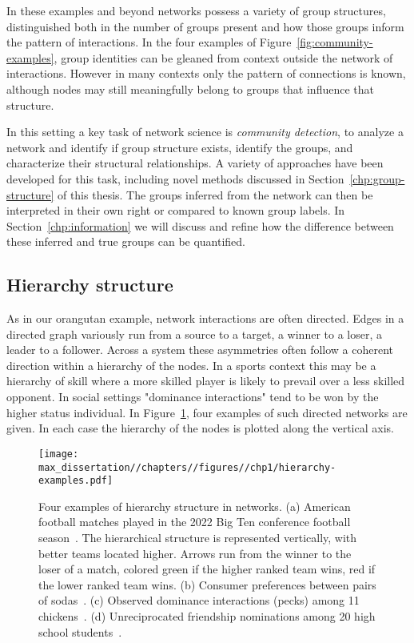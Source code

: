 In these examples and beyond networks possess a variety of group structures, distinguished both in the number of groups present and how those groups inform the pattern of interactions. In the four examples of Figure~\ref{fig:community-examples}, group identities can be gleaned from context outside the network of interactions. However in many contexts only the pattern of connections is known, although nodes may still meaningfully belong to groups that influence that structure. 

In this setting a key task of network science is \emph{community detection}, to analyze a network and identify if group structure exists, identify the groups, and characterize their structural relationships. A variety of approaches have been developed for this task, including novel methods discussed in Section~\ref{chp:group-structure} of this thesis. The groups inferred from the network can then be interpreted in their own right or compared to known group labels. In Section~\ref{chp:information} we will discuss and refine how the difference between these inferred and true groups can be quantified.

\subsection{Hierarchy structure}
\label{sec:hierarchy-structure}
As in our orangutan example, network interactions are often directed. Edges in a directed graph variously run from a source to a target, a winner to a loser, a leader to a follower. Across a system these asymmetries often follow a coherent direction within a hierarchy of the nodes. In a sports context this may be a hierarchy of skill where a more skilled player is likely to prevail over a less skilled opponent. In social settings "dominance interactions" tend to be won by the higher status individual.  In Figure~\ref{fig:hierarchy-examples}, four examples of such directed networks are given. In each case the hierarchy of the nodes is plotted along the vertical axis. 

\begin{figure}
    \centering
    \texttt{[image: max\_dissertation//chapters//figures//chp1/hierarchy-examples.pdf]}
    \caption{Four examples of hierarchy structure in networks. (a) American football matches played in the 2022 Big Ten conference football season~\cite{Football22}.  The hierarchical structure is represented vertically, with better teams located higher. Arrows run from the winner to the loser of a match, colored green if the higher ranked team wins, red if the lower ranked team wins. (b) Consumer preferences between pairs of sodas~\cite{DAK00}. (c) Observed dominance interactions (pecks) among 11 chickens~\cite{MA34}. (d) Unreciprocated friendship nominations among 20 high school students~\cite{AddHealth}.}
    \label{fig:hierarchy-examples}
\end{figure}

